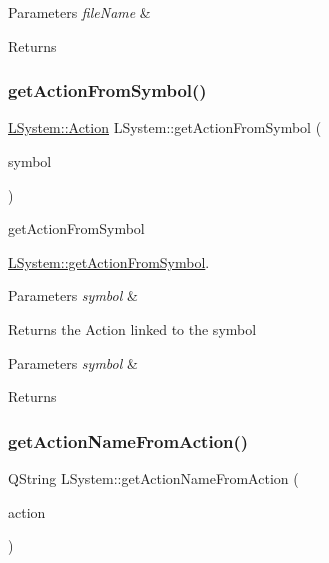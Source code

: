 \begin{DoxyParams}{Parameters}
{\em file\+Name} & \\
\hline
\end{DoxyParams}
\begin{DoxyReturn}{Returns}

\end{DoxyReturn}
\mbox{\label{classLSystem_a9ded49237eb7e5b87ce0a40c05ddd8dc}} 
\subsubsection{\texorpdfstring{get\+Action\+From\+Symbol()}{getActionFromSymbol()}}
{\footnotesize\ttfamily \hyperlink{classLSystem_a51a104d178453025feb01bd5c81298c7}{L\+System\+::\+Action} L\+System\+::get\+Action\+From\+Symbol (\begin{DoxyParamCaption}\item[{char}]{symbol }\end{DoxyParamCaption})}



get\+Action\+From\+Symbol 

\hyperlink{classLSystem_a9ded49237eb7e5b87ce0a40c05ddd8dc}{L\+System\+::get\+Action\+From\+Symbol}.


\begin{DoxyParams}{Parameters}
{\em symbol} & \\
\hline
\end{DoxyParams}
\begin{DoxyReturn}{Returns}
the Action linked to the symbol
\end{DoxyReturn}

\begin{DoxyParams}{Parameters}
{\em symbol} & \\
\hline
\end{DoxyParams}
\begin{DoxyReturn}{Returns}

\end{DoxyReturn}
\mbox{\label{classLSystem_a9e7629465147d4959c15bf678bff1325}} 
\subsubsection{\texorpdfstring{get\+Action\+Name\+From\+Action()}{getActionNameFromAction()}}
{\footnotesize\ttfamily Q\+String L\+System\+::get\+Action\+Name\+From\+Action (\begin{DoxyParamCaption}\item[{\hyperlink{classLSystem_a51a104d178453025feb01bd5c81298c7}{L\+System\+::\+Action}}]{action }\end{DoxyParamCaption})}



